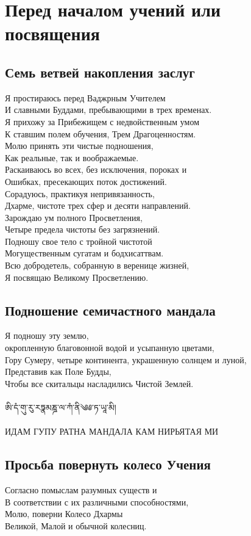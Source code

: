 \section{Перед началом учений или посвящения}

\subsection{Семь ветвей накопления заслуг}

Я простираюсь перед Ваджрным Учителем\\
И славными Буддами, пребывающими в трех временах.\\
Я прихожу за Прибежищем с недвойственным умом\\
К ставшим полем обучения, Трем Драгоценностям.\\
Молю принять эти чистые подношения,\\
Как реальные, так и воображаемые.\\
Раскаиваюсь во всех, без исключения, пороках и\\
Ошибках, пресекающих поток достижений.\\
Сорадуюсь, практикуя непривязанность,\\
Дхарме, чистоте трех сфер и десяти направлений.\\
Зарождаю ум полного Просветления,\\
Четыре предела чистоты без загрязнений.\\
Подношу свое тело с тройной чистотой\\
Могущественным сугатам и бодхисаттвам.\\
Всю добродетель, собранную в веренице жизней,\\
Я посвящаю Великому Просветлению.
\newpage

\subsection{Подношение семичастного мандала}

Я подношу эту землю, \\
\indent окропленную благовонной водой и усыпанную цветами,\\
Гору Сумеру, четыре континента, украшенную солнцем и луной,\\
Представив как Поле Будды,\\
Чтобы все скитальцы насладились Чистой Землей.\\
\\
\ti 
ཨི་དཾ་གུ་རུ་རཏྣམཎྜ་ལ་ཀཾ་ནི༄༅་ཏ་ཡཱ་མི།\\
\\
\ru ИДАМ ГУПУ РАТНА МАНДАЛА КАМ НИРЬЯТАЯ МИ

\subsection{Просьба повернуть колесо Учения}

Согласно помыслам разумных существ и\\
В соответствии с их различными способностями,\\
Молю, поверни Колесо Дхармы\\
Великой, Малой и обычной колесниц.